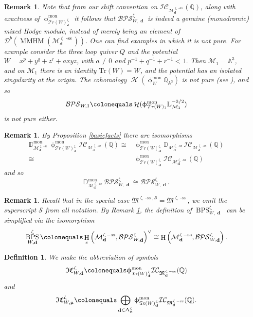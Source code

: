\documentclass[a4paper,10pt]{amsart}
\renewcommand{\zeta}{\upzeta}
\renewcommand{\Lambda}{\Uplambda}
\renewcommand{\phi}{\upphi}
\renewcommand{\mu}{\upmu}
\newtheorem{definition}[theorem]{Definition}
\newtheorem{remark}[theorem]{Remark}
\newcommand{\DD}{\mathbb{D}}
\newcommand{\SP}{\mathcal{S}}
\newcommand{\W}{\mathrm{Tr}(W)}
\newcommand{\WW}{\mathcal{T}r(W)}
\newcommand{\WWW}{\mathfrak{Tr}(W)}
\newcommand{\Mst}{\mathfrak{M}}
\newcommand{\Msp}{\mathcal{M}}
\newcommand{\ICS}{\mathcal{IC}}
\newcommand{\ICSt}{\mathfrak{IC}}
\newcommand{\DTS}{\mathcal{BPS}}
\newcommand{\phim}[1]{\phi^{\mon}_{#1}}
\DeclareMathOperator{\sst}{-ss}
\DeclareMathOperator{\mon}{mon}
\DeclareMathOperator{\MMHM}{MMHM}
\DeclareMathOperator{\dd}{\mathbf{d}}
\DeclareMathOperator{\DT}{BPS}
\DeclareMathOperator{\Ho}{\mathcal{H}}
\DeclareMathOperator{\HO}{H}
\newcommand{\Db}{\mathcal{D}^{b}}
\begin{document}
\begin{remark}
Note that from our shift convention on $\ICS_{\Msp^{\zeta\sst}_{\dd}}(\mathbb{Q})$, along with exactness of $\phim{\WW^{\zeta}_{\dd}}$ it follows that $\DTS_{W,\dd}^{\zeta}$ is indeed a genuine (monodromic) mixed Hodge module, instead of merely being an element of $\Db(\MMHM(\Msp^{\zeta\sst}_{\dd}))$.  One can find examples in which it is not pure.  For example consider the three loop quiver $Q$ and the potential $W=x^p+y^q+z^r+axyz$, with $a\neq 0$ and $p^{-1}+q^{-1}+r^{-1}<1$.  Then $\Msp_1=\mathbb{A}^3$, and on $\Msp_1$ there is an identity $\W=W$, and the potential has an isolated singularity at the origin.  The cohomology $\Ho(\phim{W}\mathbb{Q}_{\mathbb{A}^3})$ is not pure (see \cite[Rem.3.5]{DMSS15} \cite[Ex.7.3.5]{Kul98} \cite[Ex.9.1]{Sch85}), and so
\[
\DTS_{W,1}\colonequals \Ho(\phim{\WW_{1}}\mathbb{L}^{-3/2}_{\Msp_1})
\]
is not pure either.
\end{remark}
\begin{remark}
\label{sdrem}
By Proposition \ref{basicfacts} there are isomorphisms
\begin{align*}
\DD^{\mon}_{\Msp_{\dd}^{\zeta\sst}}\phim{\WW^{\zeta}_{\dd}}\ICS_{\Msp^{\zeta\sst}_{\dd}}(\mathbb{Q})\cong& \phim{\WW^{\zeta}_{\dd}}\DD_{\Msp_{\dd}^{\zeta\sst}}\ICS_{\Msp^{\zeta\sst}_{\dd}}(\mathbb{Q})\\
\cong&\phim{\WW^{\zeta}_{\dd}}\ICS_{\Msp^{\zeta\sst}_{\dd}}(\mathbb{Q})
\end{align*}
and so
\begin{equation}
\label{sdual}
\DD^{\mon}_{\Msp^{\zeta\sst}_{\dd}}\DTS_{W,\dd}^{\zeta}\cong\DTS_{W,\dd}^{\zeta}.
\end{equation}
\end{remark}

\begin{remark}
Recall that in the special case $\Mst^{\zeta\sst,\SP}=\Mst^{\zeta\sst}$, we omit the superscript $\SP$ from all notation.  By Remark \ref{sdrem}, the definition of $\DT^{\zeta}_{W,\dd}$ can be simplified via the isomorphism
\[
\DT^{\zeta}_{W,\dd}\colonequals \HO_c\left(\Msp^{\zeta\sst}_{\dd},\DTS_{W,\dd}^{\zeta}\right)^{\vee}\cong \HO\left(\Msp^{\zeta\sst}_{\dd},\DTS_{W,\dd}^{\zeta}\right).
\]
\end{remark}


\begin{definition}
\label{abbrev}
We make the abbreviation of symbols
\[
\ICSt_{W,\dd}^{\zeta}\colonequals \phim{\WWW^{\zeta}_{\dd}}\ICS_{\Mst_{\dd}^{\zeta\sst}}(\mathbb{Q})
\]
and
\[
\ICSt_{W,\mu}^{\zeta}\colonequals \bigoplus_{\dd\in\Lambda_{\mu}^{\zeta}}\phim{\WWW^{\zeta}_{\dd}}\ICS_{\Mst_{\dd}^{\zeta\sst}}(\mathbb{Q}).
\]
\end{definition}
\end{document}

